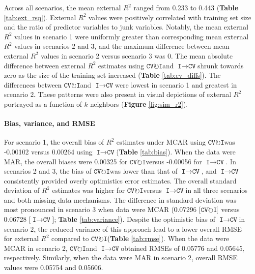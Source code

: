 \documentclass[AMA,STIX1COL,doublespace]{WileyNJD-v2}
\begin{document}
Across all scenarios, the mean external \(R^2\) ranged from 0.233 to
0.443 (\textbf{Table} \ref{tab:ext_rsq}). External \(R^2\) values were
positively correlated with training set size and the ratio of predictor
variables to junk variables. Notably, the mean external \(R^2\) values
in scenario 1 were uniformly greater than corresponding mean external
\(R^2\) values in scenarios 2 and 3, and the maximum difference between
mean external \(R^2\) values in scenario 2 versus scenario 3 was 0. The
mean absolute difference between external \(R^2\) estimates using
$\texttt{CV}\!\circlearrowright\!\texttt{I}$\space and
$\texttt{I}\!\!\rightarrow\!\texttt{CV}$\space shrunk towards zero as
the size of the training set increased (\textbf{Table}
\ref{tab:cv_diffs}). The differences between
$\texttt{CV}\!\circlearrowright\!\texttt{I}$\space and
$\texttt{I}\!\!\rightarrow\!\texttt{CV}$\space were lowest in scenario 1
and greatest in scenario 2. These patterns were also present in visual
depictions of external \(R^2\) portrayed as a function of \(k\)
neighbors (\textbf{Figure} \ref{fig:sim_r2}).

\paragraph{Bias, variance, and RMSE}

For scenario 1, the overall bias of \(R^2\) estimates under MCAR using
$\texttt{CV}\!\circlearrowright\!\texttt{I}$\space was -0.00102 versus
0.00264 using
$\texttt{I}\!\!\rightarrow\!\texttt{CV}$\space (\textbf{Table}
\ref{tab:bias}). When the data were MAR, the overall biases were 0.00325
for $\texttt{CV}\!\circlearrowright\!\texttt{I}$\space versus -0.00056
for $\texttt{I}\!\!\rightarrow\!\texttt{CV}$\space. In scenarios 2 and
3, the bias of $\texttt{CV}\!\circlearrowright\!\texttt{I}$\space was
lower than that of $\texttt{I}\!\!\rightarrow\!\texttt{CV}$\space, and
$\texttt{I}\!\!\rightarrow\!\texttt{CV}$\space consistently provided
overly optimistics error estimates. The overall standard deviation of
\(R^2\) estimates was higher for
$\texttt{CV}\!\circlearrowright\!\texttt{I}$\space versus
$\texttt{I}\!\!\rightarrow\!\texttt{CV}$\space in all three scenarios
and both missing data mechanisms. The difference in standard deviation
was most pronounced in scenario 3 when data were MCAR (0.07296
{[}$\texttt{CV}\!\circlearrowright\!\texttt{I}${]} versus 0.06728
{[}$\texttt{I}\!\!\rightarrow\!\texttt{CV}${]}; \textbf{Table}
\ref{tab:variance}). Despite the optimistic bias of
$\texttt{I}\!\!\rightarrow\!\texttt{CV}$\space in scenario 2, the
reduced variance of this approach lead to a lower overall RMSE for
external \(R^2\) compared to
$\texttt{CV}\!\circlearrowright\!\texttt{I}$\space (\textbf{Table}
\ref{tab:rmse}). When the data were MCAR in scenario 2,
$\texttt{CV}\!\circlearrowright\!\texttt{I}$\space and
$\texttt{I}\!\!\rightarrow\!\texttt{CV}$\space obtained RMSEs of 0.05776
and 0.05645, respectively. Similarly, when the data were MAR in scenario
2, overall RMSE values were 0.05754 and 0.05606.
\end{document}
